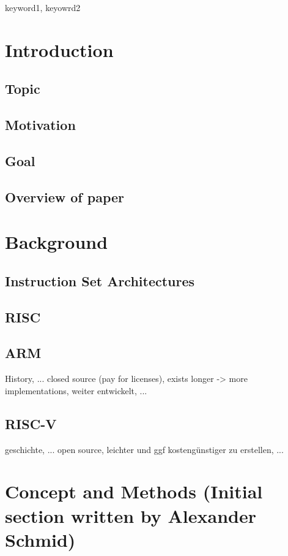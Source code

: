 \documentclass[conference]{IEEEtran}
\begin{document}
\begin{IEEEkeywords}
keyword1, keyowrd2
\end{IEEEkeywords}

\section{Introduction}
\label{ref:introduction}
	\subsection{Topic}
	\subsection{Motivation}
	\subsection{Goal}
	\subsection{Overview of paper}

\section{Background}
\label{ref:background}
	\subsection{Instruction Set Architectures}
	\subsection{RISC}
	\subsection{ARM}
	History, ...
	closed source (pay for licenses), exists longer -> more implementations, weiter entwickelt, ...
	\subsection{RISC-V}
	geschichte, ...
	open source, leichter und ggf kostengünstiger zu erstellen, ...

\section{Concept and Methods (Initial section written by Alexander Schmid)}
\label{ref:concept}
\end{document}
